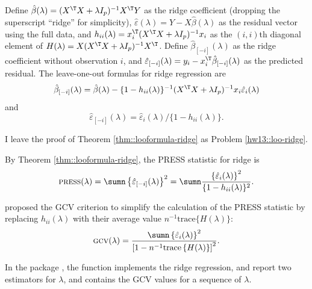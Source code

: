  
\begin{theorem}\label{thm::looformula-ridge}
Define $\hat{\beta}(\lambda) = (X^{\T} X + \lambda I_p)^{-1} X^{\T} Y$ as the ridge coefficient (dropping the superscript ``ridge'' for simplicity), $\hat{\varepsilon}(\lambda) = Y - X \hat{\beta}(\lambda)$ as the residual vector using the full data, and $ h_{ii} (\lambda) = x_i^{\T} (X^{\T} X + \lambda I_p)^{-1}  x_i$ as the $(i,i)$th diagonal element of $H  (\lambda)  =  X (X^{\T} X + \lambda I_p)^{-1}  X^{\T} $. Define  $\hat{\beta}_{[-i]} (\lambda)$ as the ridge coefficient without observation $i$, and $\hat{\varepsilon}_{[-i]} (\lambda) = y_i - x_i^{\T}  \hat{\beta}_{[-i]} (\lambda)$ as the predicted residual. The leave-one-out formulas for ridge regression are
$$
\hat{\beta}_{[-i]}(\lambda) =  \hat{\beta}(\lambda)  - \{ 1-h_{ii}  (\lambda)  \} ^{-1}  (X^{\T} X + \lambda I_p)^{-1} x_i \hat{\varepsilon}_i(\lambda)
$$
and
$$
\hat{\varepsilon}_{[-i]}(\lambda) = \hat{\varepsilon}_i (\lambda)/ \{  1-h_{ii}  (\lambda) \} .
$$
\end{theorem} 


I leave the proof of Theorem \ref{thm::looformula-ridge} as Problem  \ref{hw13::loo-ridge}. 

By Theorem \ref{thm::looformula-ridge}, the PRESS statistic for ridge is 
$$
\textsc{press}  (\lambda)  = \sumn \left\{   \hat{\varepsilon}_{[-i]} (\lambda) \right \}^2 
= \sumn \frac{   \left\{  \hat{\varepsilon}_i (\lambda) \right\}^2 }{ \{ 1-h_{ii}  (\lambda)  \} ^2 }.
$$
 
 
\citet{golub1979generalized} proposed the GCV criterion to simplify the calculation of the PRESS statistic by replacing $h_{ii} (\lambda)$ with their average value $n^{-1} \text{trace}\{ H(\lambda) \}$:
\[
\textsc{gcv}(\lambda)=\frac{\sumn\left\{   \hat{\varepsilon}_i (\lambda)   \right\} ^{2}}{\left[1-n^{-1}\text{trace}\left\{ H(\lambda)\right\} \right]^{2}}.
\]
 
In the  package , the function  implements the ridge regression,  and  report two estimators for $\lambda$, and  contains the GCV values for a sequence of $\lambda$. 
 



 
 
